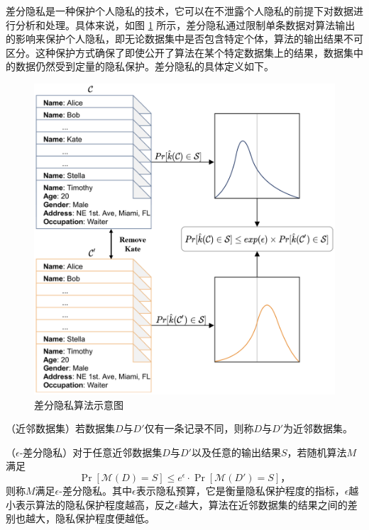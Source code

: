 差分隐私是一种保护个人隐私的技术，它可以在不泄露个人隐私的前提下对数据进行分析和处理。具体来说，如图 \ref{DP_demo} 所示，差分隐私通过限制单条数据对算法输出的影响来保护个人隐私，即无论数据集中是否包含特定个体，算法的输出结果不可区分。这种保护方式确保了即使公开了算法在某个特定数据集上的结果，数据集中的数据仍然受到定量的隐私保护。差分隐私的具体定义如下。

\begin{figure}[h]
	\centering
	\includegraphics[width=0.8\linewidth]{figures/DP.png}
	\caption{差分隐私算法示意图}
	\label{DP_demo}
\end{figure}

\begin{definition}
	（近邻数据集\cite{dwork2006our}）若数据集$D$与$D'$仅有一条记录不同，则称$D$与$D'$为近邻数据集。
\end{definition}



\begin{definition}
	（$\epsilon$-差分隐私\cite{dwork2006our}）对于任意近邻数据集$D$与$D'$以及任意的输出结果$S$，若随机算法$M$满足
	\begin{equation}
		\label{eps-dp}
		\mathop{Pr}[\mathcal{M}(D) = S] \leq e^{\epsilon} \cdot \mathop{Pr}[\mathcal{M}(D') = S]\text{，}
	\end{equation}
	则称$M$满足$\epsilon$-差分隐私。其中$\epsilon$表示隐私预算，它是衡量隐私保护程度的指标，$\epsilon$越小表示算法的隐私保护程度越高，反之$\epsilon$越大，算法在近邻数据集的结果之间的差别也越大，隐私保护程度便越低。
\end{definition}

